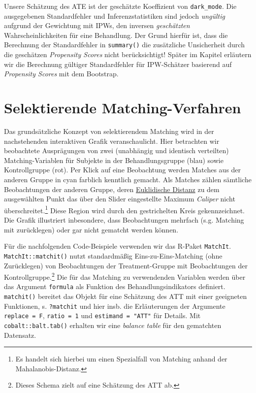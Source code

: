 \documentclass[
  a4paper,
  DIV=11,
  oneside]{scrreprt}
\begin{document}
Unsere Schätzung des ATE ist der geschätzte Koeffizient von
\texttt{dark\_mode}. Die ausgegebenen Standardfehler und
Inferenzstatistiken sind jedoch \emph{ungültig} aufgrund der Gewichtung
mit IPWs, den inversen \emph{geschätzten} Wahrscheinlichkeiten für eine
Behandlung. Der Grund hierfür ist, dass die Berechnung der
Standardfehler in \texttt{summary()} die zusätzliche Unsicherheit durch
die geschätzen \emph{Propensity Scores} nicht berücksichtigt! Später im
Kapitel erläutern wir die Berechnung gültiger Standardfehler für
IPW-Schätzer basierend auf \emph{Propensity Scores} mit dem Bootstrap.

\hypertarget{selektierende-matching-verfahren}{%
\section{Selektierende
Matching-Verfahren}\label{selektierende-matching-verfahren}}

Das grundsätzliche Konzept von selektierendem Matching wird in der
nachstehenden interaktiven Grafik veranschaulicht. Hier betrachten wir
beobachtete Ausprägungen von zwei (unabhängig und identisch verteilten)
Matching-Variablen für Subjekte in der Behandlungsgruppe (blau) sowie
Kontrollgruppe (rot). Per Klick auf eine Beobachtung werden Matches aus
der anderen Gruppe in cyan farblich kenntlich gemacht. Als Matches
zählen sämtliche Beobachtungen der anderen Gruppe, deren
\href{https://de.wikipedia.org/wiki/Euklidischer_Abstand}{Euklidische
Distanz} zu dem ausgewählten Punkt das über den Slider eingestellte
Maximum \emph{Caliper} nicht überschreitet.\footnote{Es handelt sich
  hierbei um einen Spezialfall von Matching anhand der
  Mahalanobis-Distanz.} Diese Region wird durch den gestrichelten Kreis
gekennzeichnet. Die Grafik illustriert inbesondere, dass Beobachtungen
mehrfach (s.g. Matching mit zurücklegen) oder gar nicht gematcht werden
können.

Für die nachfolgenden Code-Beispiele verwenden wir das R-Paket
\texttt{MatchIt}. \texttt{MatchIt::matchit()} nutzt standardmäßig
Eins-zu-Eins-Matching (ohne Zurücklegen) von Beobachtungen der
Treatment-Gruppe mit Beobachtungen der Kontrollgruppe.\footnote{Dieses
  Schema zielt auf eine Schätzung des ATT ab.} Die für das Matching zu
verwendenden Variablen werden über das Argument \texttt{formula} als
Funktion des Behandlungsindikators definiert. \texttt{matchit()}
bereitet das Objekt für eine Schätzung des ATT mit einer geeigneten
Funktionen, s. \texttt{?matchit} und hier insb. die Erläuterungen der
Argumente \texttt{replace\ =\ F}, \texttt{ratio\ =\ 1} und
\texttt{estimand\ =\ "ATT"} für Details. Mit \texttt{cobalt::balt.tab()}
erhalten wir eine \emph{balance table} für den gematchten Datensatz.
\end{document}
